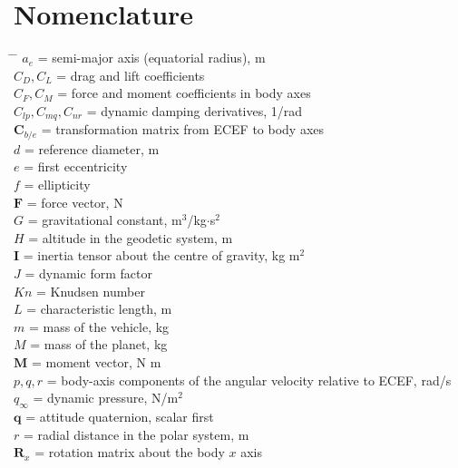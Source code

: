 \documentclass[11pt,a4paper]{article}
\newcommand{\bF}{{\boldsymbol F}}
\newcommand{\bM}{{\boldsymbol M}}
\newcommand{\bI}{{\boldsymbol I}}
\newcommand{\bq}{{\boldsymbol q}}
\newcommand{\bC}{{\boldsymbol C}}
\newcommand{\bR}{{\boldsymbol R}}
\begin{document}
\section*{Nomenclature}
\begin{tabbing}
\hspace{7.0em}\= \hspace{1.5em} \= \hspace{11cm} \kill
	$a_e$      \> = \> semi-major axis (equatorial radius), m \\
	$C_D, C_L$ \> = \> drag and lift coefficients \\
	$C_{F}, C_{M}$ \> = \> force and moment coefficients in body axes \\
	$C_{lp}, C_{mq}, C_{nr}$ \> = \> dynamic damping derivatives, 1/rad \\
	$\bC_{b/e}$ \> = \> transformation matrix from ECEF to body axes \\
	$d$        \> = \> reference diameter, m \\
	$e$        \> = \> first eccentricity \\
	$f$        \> = \> ellipticity \\
	$\bF$      \> = \> force vector, N \\
	$G$        \> = \> gravitational constant, m$^3$/kg$\cdot$s$^2$ \\
	$H$        \> = \> altitude in the geodetic system, m \\
	$\bI$      \> = \> inertia tensor about the centre of gravity, kg m$^2$ \\
	$J$        \> = \> dynamic form factor \\
	$Kn$       \> = \> Knudsen number \\
	$L$        \> = \> characteristic length, m \\
	$m$        \> = \> mass of the vehicle, kg \\
	$M$        \> = \> mass of the planet, kg \\
	$\bM$      \> = \> moment vector, N m \\
	$p, q, r$  \> = \> body-axis components of the angular velocity relative to ECEF, rad/s \\
	$q_{\infty}$ \> = \> dynamic pressure, N/m$^2$ \\
	$\bq$      \> = \> attitude quaternion, scalar first \\
	$r$        \> = \> radial distance in the polar system, m \\
	$\bR_x$    \> = \> rotation matrix about the body $x$ axis \\

\end{tabbing}
\end{document}
